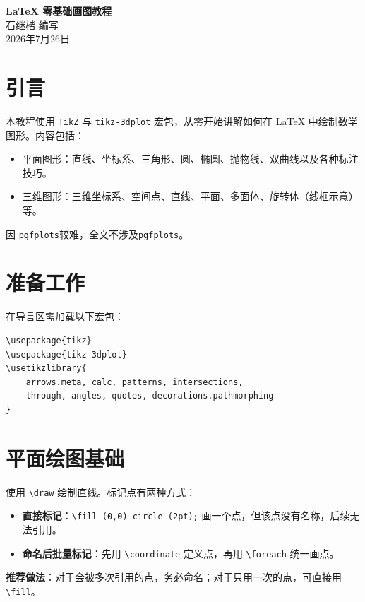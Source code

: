 \documentclass{article}
\begin{document}
\begin{center}
	{\LARGE \textbf{LaTeX 零基础画图教程}} \\[0.5cm]
	{\large {\kaishu 石继楷 \quad 编写}} \\[0.3cm]
	{\normalsize 2026年7月26日}
\end{center}

\tableofcontents
\newpage

\section{引言}
本教程使用 \texttt{TikZ} 与 \texttt{tikz-3dplot} 宏包，从零开始讲解如何在 LaTeX 中绘制数学图形。内容包括：
\begin{itemize}
	\item 平面图形：直线、坐标系、三角形、圆、椭圆、抛物线、双曲线以及各种标注技巧。
	\item 三维图形：三维坐标系、空间点、直线、平面、多面体、旋转体（线框示意）等。
\end{itemize}
因 \texttt{pgfplots}较难，全文不涉及\texttt{pgfplots}。

\section{准备工作}
在导言区需加载以下宏包：
\begin{lstlisting}
\usepackage{tikz}
\usepackage{tikz-3dplot}
\usetikzlibrary{
	arrows.meta, calc, patterns, intersections, 
	through, angles, quotes, decorations.pathmorphing
}
\end{lstlisting}

\section{平面绘图基础}

使用 \verb|\draw| 绘制直线。标记点有两种方式：

\begin{itemize}
	\item \textbf{直接标记}：\verb|\fill (0,0) circle (2pt);| 画一个点，但该点没有名称，后续无法引用。
	\item \textbf{命名后批量标记}：先用 \verb|\coordinate| 定义点，再用 \verb|\foreach| 统一画点。
\end{itemize}

\textbf{推荐做法}：对于会被多次引用的点，务必命名；对于只用一次的点，可直接用 \verb|\fill|。
\end{document}
